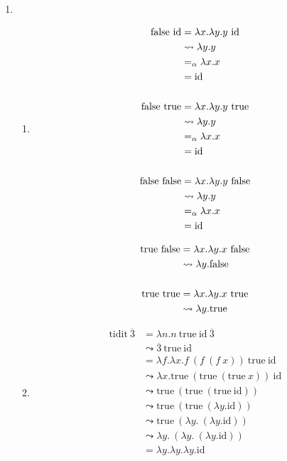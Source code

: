 \documentclass[11pt,a4paper,twoside]{article}
\newcommand{\true}{\mathrm{true}}
\newcommand{\false}{\mathrm{false}}
\newcommand{\id}{\mathrm{id}}
\newcommand{\numeral}[1]{\overline{#1}}
\begin{document}
\begin{enumerate}
  \pagebreak
  \item %
  \begin{enumerate}
    \item %
    \begin{multicols}{2}
    \begin{align*}
      \false\ \id &= \lambda x. \lambda y. y\ \id \\
                  &\leadsto \lambda y. y \\
                  &=_\alpha \lambda x. x \\
                  &= \id \\
      \smallskip \\
      \false\ \true &= \lambda x. \lambda y. y\ \true \\
                    &\leadsto \lambda y. y \\
                    &=_\alpha \lambda x. x \\
                    &= \id \\
      \smallskip \\
      \false\ \false &= \lambda x. \lambda y. y\ \false \\
                     &\leadsto \lambda y. y \\
                     &=_\alpha \lambda x. x \\
                     &= \id \\
    \end{align*}
    \vfill

    \begin{align*}
      \true\ \false &= \lambda x. \lambda y. x\ \false \\
                    &\leadsto \lambda y. \false \\
      \smallskip \\
      \true\ \true &= \lambda x. \lambda y. x\ \true \\
                   &\leadsto \lambda y. \true \\
    \end{align*}
    \vfill
    \end{multicols}

    \item %
      \begin{align*}
        \mathrm{tidit} \ \numeral{3}
          &= \lambda n. n \ \true\ \id\ \numeral{3} \\
          &\leadsto \numeral{3} \ \true\ \id \\
          &= \lambda f. \lambda x. f\ (f\ (f\ x))\ \true\ \id \\
          &\leadsto \lambda x. \true\ (\true\ (\true\ x))\ \id \\
          &\leadsto \true\ (\true\ (\true\ \id)) \\
          &\leadsto \true\ (\true\ (\lambda y.\id)) \\
          &\leadsto \true\ (\lambda y.\ (\lambda y.\id)) \\
          &\leadsto \lambda y.\ (\lambda y.\ (\lambda y.\id)) \\
          &= \lambda y.\lambda y.\lambda y.\id \\
      \end{align*}


\end{enumerate}
\end{enumerate}
\end{document}
